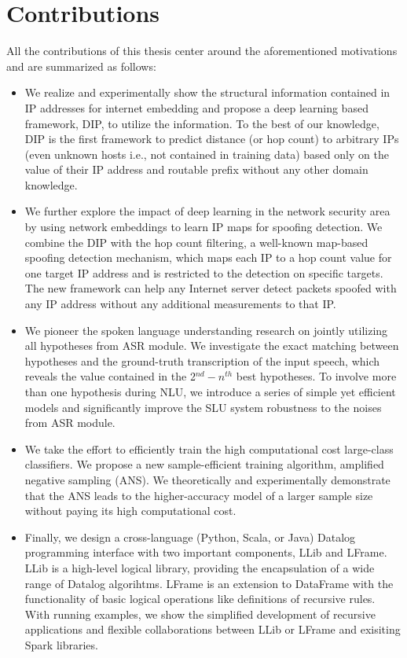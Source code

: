 \documentclass [PhD] {uclathes}
\begin{document}
\section{Contributions}
All the contributions of this thesis center around  the aforementioned motivations and are summarized as follows:
\begin{itemize}
	\item We realize and experimentally show  the structural information contained in IP addresses for internet embedding and propose a deep learning based framework, DIP, to utilize the information. To the best of our knowledge, DIP is the first framework to predict distance (or hop count) to arbitrary IPs (even unknown hosts i.e., not contained in training data) based only on the value of their IP address and routable prefix without any other domain knowledge.
	\item We further explore the impact of deep learning in the network  security area by using network embeddings to learn IP maps for spoofing detection. We  combine the DIP with the hop count filtering, a well-known map-based spoofing detection mechanism, which maps each IP to a hop count value for one target IP address and is restricted to the detection on specific targets. The new framework can help any Internet server detect packets spoofed with any IP address without any additional measurements to that IP.
	\item We pioneer the spoken language understanding research on jointly utilizing all hypotheses from ASR module. We investigate the exact matching between hypotheses and the ground-truth transcription of the input speech, which reveals the value contained in the 2$^{nd}-n^{th}$ best hypotheses. To involve more than one hypothesis during NLU, we introduce a series of simple yet efficient models and significantly improve the SLU system robustness to the noises from  ASR module. 
	\item We take the effort to efficiently train the high computational cost large-class classifiers. We propose a new sample-efficient training algorithm, amplified negative sampling (ANS). We theoretically and experimentally demonstrate  that the ANS leads to the higher-accuracy model of a larger sample size without paying its high computational cost.
	\item Finally, we design a cross-language (Python, Scala, or Java) Datalog programming interface with two important components, LLib and LFrame. LLib is a high-level logical library, providing the encapsulation of a wide range of Datalog algorihtms.  LFrame is an extension to DataFrame with the functionality of basic logical operations like  definitions of recursive rules. With running examples, we show the simplified development of recursive applications   and flexible collaborations between LLib or LFrame and exisiting Spark libraries.
\end{itemize}
\end{document}
